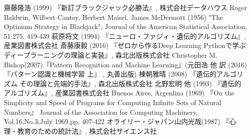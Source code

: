 \begin{thebibliography}{9}
   齋藤隆浩 (1999) 『新訂ブラックジャック必勝法』, 株式会社データハウス
   Roger Baldwin, Wilbert Cantey, Herbert Maisel, James McDermott (1956) "The Optimum Strategy in Blackjack", Journal of the American Statistical Association, 51:275, 419-439
   萩原将文 (1994) 『ニューロ・ファジィ・遺伝的アルゴリズム』, 産業図書株式会社
   斎藤康毅 (2016) 『ゼロから作るDeep Learning Pythonで学ぶディープラーニングの理論と実装』, 森北出版株式会社
   Christopher M. Bishop(2007)『Pattern Recognition and Machine Learning』(元田浩 他 訳 (2016) 『パターン認識と機械学習 上』 , 丸善出版)
   棟朝雅晴 (2008) 『遺伝的アルゴリズム その理論と先端的手法』, 森北出版株式会社
   北野宏明 他 (1993) 『遺伝的アルゴリズム』, 産業図書株式会社
   Buenos Aires, Argenlina (1969) 『On the Simplicity and Speed of Programs for Computing Infinite Sets of Natural Numbers』 Journal of the Association for Computing Machinery, Vol.16,No.3,July 1969,pp. 407-422
   オライリー・ジャパン山内光哉(1987) 『心理・教育のための統計法』, 株式会社サイエンス社
\end{thebibliography}
